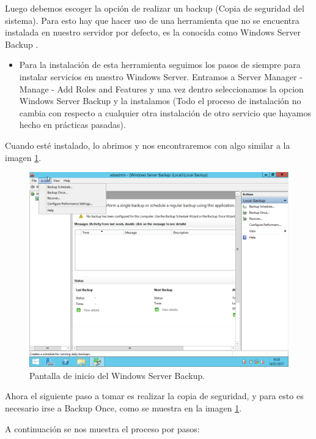 Luego debemos escoger la opción de realizar un backup (Copia de seguridad del sistema). Para esto hay que hacer uso de una herramienta que no se encuentra instalada en nuestro servidor por defecto, es la conocida como Windows Server Backup \cite{INSTALACIONPOINTRESTORE}.

\begin{itemize}
	\item Para la instalación de esta herramienta seguimos los pasos de siempre para instalar servicios en nuestro Windows Server. Entramos a Server Manager - Manage - Add Roles and Features y una vez dentro seleccionamos la opcion Windows Server Backup y la instalamos (Todo el proceso de instalación no cambia con respecto a cualquier otra instalación de otro servicio que hayamos hecho en prácticas pasadas).
\end{itemize}

Cuando esté instalado, lo abrimos y nos encontraremos con algo similar a la imagen \ref{fig:9}.
 
\begin{figure}[H]
	\begin{center}
		\includegraphics[width=15cm]{Imagenes/Entrando_windows_server_backup}
		\caption{Pantalla de inicio del Windows Server Backup.}
		\label{fig:9}
	\end{center}
\end{figure}

Ahora el siguiente paso a tomar es realizar la copia de seguridad, y para esto es necesario irse a Backup Once, como se muestra en la imagen \ref{fig:9}.

A continuación se nos muestra el proceso por pasos:

